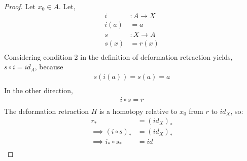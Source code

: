 \documentclass[../notes.tex]{subfiles}
\begin{document}
    \begin{proof} Let $x_0\in A$. Let,
            \begin{align*}
                i&: A\rightarrow X\\
                i(a)&=a\\
                s&: X\rightarrow A\\
                s(x)&=r(x)\\
            \end{align*}
            Considering condition 2 in the definition
            of deformation retraction yields, $s\circ i= id_A$, because
            \begin{align*}
                s(i(a))=s(a)=a\\
            \end{align*}
            In the other direction,
            \begin{align*}
                i\circ s = r\\
            \end{align*}
            The deformation retraction $H$ is a homotopy relative to $x_0$ from $r$ to $id_X$, so:
            \begin{align*}
                r_*&=(id_X)_*\\
                \implies (i\circ s)_*&=(id_X)_*\\
                \implies i_* \circ s_*&=id\\
            \end{align*}
    \end{proof}
\end{document}
